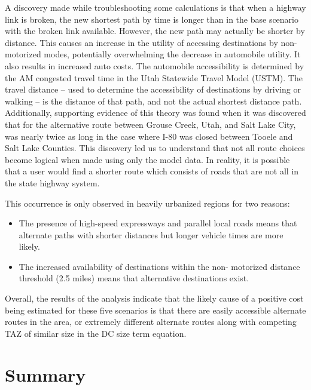 A discovery made while troubleshooting some calculations is that when a highway link is broken, the new
shortest path by time is longer than in the base scenario with the broken link
available. However, the new path may actually be shorter by distance. This
causes an increase in the utility of accessing destinations by non-
motorized modes, potentially overwhelming the decrease in automobile
utility. It also results in increased auto costs. The automobile accessibility is determined by the AM congested
travel time in the Utah Statewide Travel Model (USTM). The travel distance
– used to determine the accessibility of destinations by driving or
walking – is the distance of that path, and not the actual shortest
distance path. Additionally,
supporting evidence of this theory was found when it was discovered that for
the alternative route between Grouse Creek, Utah, and Salt Lake City,
was nearly twice as long in the case where I-80 was closed between
Tooele and Salt Lake Counties. This discovery led us to understand that not all
route choices become logical when made using only the model data. In
reality, it is possible that a user would find a shorter route
which consists of roads that are not all in the state highway system.

This occurrence is only observed in heavily urbanized regions for two reasons:
\begin{itemize}
	\item The presence of high-speed expressways and parallel local roads
  means that alternate paths with shorter distances but longer vehicle
  times are more likely.
	\item The increased availability of destinations within the non-
  motorized distance threshold (2.5 miles) means that alternative
  destinations exist.

\end{itemize}

Overall, the results of the analysis indicate that the likely cause of a
positive cost being estimated for these five scenarios is that there are
easily
accessible alternate routes in the area, or extremely different alternate
routes along with competing TAZ of similar size in the DC size term
equation.

\section{Summary}

